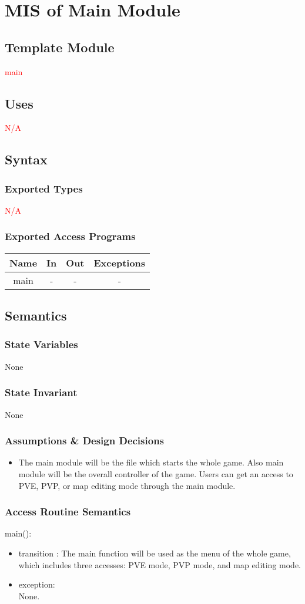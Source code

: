 \documentclass[12pt, titlepage]{article}
\begin{document}
		
		
\section{MIS of Main Module}
        \subsection{Template Module}
        \textcolor{red}{main}
        \subsection{Uses}
        \textcolor{red}{N/A}
		\subsection{Syntax}
		\subsubsection{Exported Types}
		\textcolor{red}{N/A}
		\subsubsection{Exported Access Programs}
				\begin{tabular}[pos]{|c|c|c|c|}
					
					\hline
					\textbf{Name}& \textbf{In} & \textbf{Out} & \textbf{Exceptions} \\ \hline
					main & - & - & -\\ \hline
			    \end{tabular}

		\subsection{Semantics}
		\subsubsection{State Variables}
		None
		
		\subsubsection{State Invariant}
		None
		
		\subsubsection{Assumptions \& Design Decisions}
		\begin{itemize}
		\item The main module will be the file which starts the whole game. Also main module will be the overall controller of the game. Users can get an access to PVE, PVP, or map editing mode through the main module.
		\end{itemize}
		\subsubsection{Access Routine Semantics}
		main(): \\
		\begin{itemize}
		\item transition : The main function will be used as the menu of the whole game, which includes three accesses: PVE mode, PVP mode, and map editing mode. 
		
		\item exception:\\None.
		\end{itemize}
		   
\end{document}
